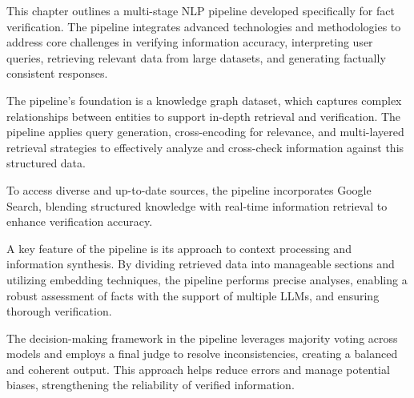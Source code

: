 %

This chapter outlines a multi-stage NLP pipeline developed specifically for fact verification.
The pipeline integrates advanced technologies and methodologies to address core challenges in verifying information accuracy, interpreting user queries, retrieving relevant data from large datasets, and generating factually consistent responses.

The pipeline's foundation is a knowledge graph dataset, which captures complex relationships between entities to support in-depth retrieval and verification.
The pipeline applies query generation, cross-encoding for relevance, and multi-layered retrieval strategies to effectively analyze and cross-check information against this structured data.

To access diverse and up-to-date sources, the pipeline incorporates Google Search, blending structured knowledge with real-time information retrieval to enhance verification accuracy.

A key feature of the pipeline is its approach to context processing and information synthesis.
By dividing retrieved data into manageable sections and utilizing embedding techniques, the pipeline performs precise analyses, enabling a robust assessment of facts with the support of multiple LLMs, and ensuring thorough verification.

The decision-making framework in the pipeline leverages majority voting across models and employs a final judge to resolve inconsistencies, creating a balanced and coherent output.
This approach helps reduce errors and manage potential biases, strengthening the reliability of verified information.

